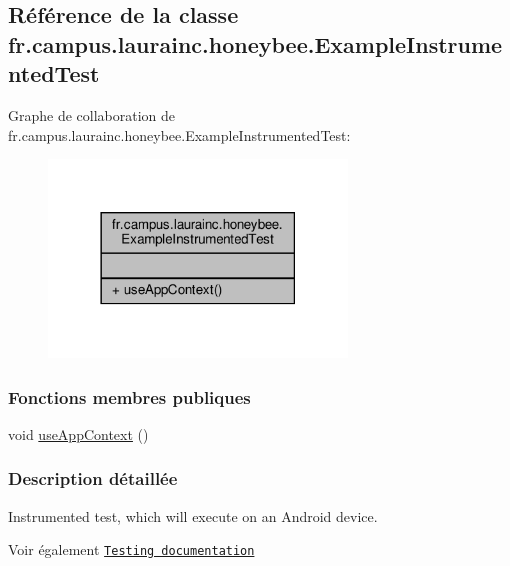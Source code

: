 \hypertarget{classfr_1_1campus_1_1laurainc_1_1honeybee_1_1_example_instrumented_test}{}\subsection{Référence de la classe fr.\+campus.\+laurainc.\+honeybee.\+Example\+Instrumented\+Test}
\label{classfr_1_1campus_1_1laurainc_1_1honeybee_1_1_example_instrumented_test}


Graphe de collaboration de fr.\+campus.\+laurainc.\+honeybee.\+Example\+Instrumented\+Test\+:\nopagebreak
\begin{figure}[H]
\begin{center}
\leavevmode
\includegraphics[width=225pt]{classfr_1_1campus_1_1laurainc_1_1honeybee_1_1_example_instrumented_test__coll__graph}
\end{center}
\end{figure}
\subsubsection*{Fonctions membres publiques}
\begin{DoxyCompactItemize}
\item 
void \hyperlink{classfr_1_1campus_1_1laurainc_1_1honeybee_1_1_example_instrumented_test_a9474da2c6615d495569abe302049f465}{use\+App\+Context} ()
\end{DoxyCompactItemize}


\subsubsection{Description détaillée}
Instrumented test, which will execute on an Android device.

\begin{DoxySeeAlso}{Voir également}
\href{http://d.android.com/tools/testing}{\tt Testing documentation} 
\end{DoxySeeAlso}


